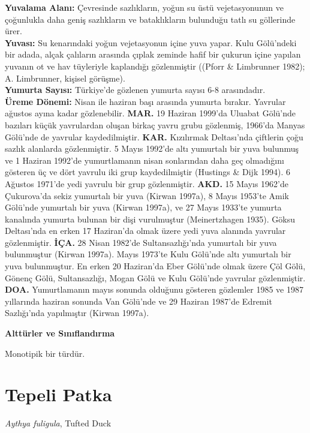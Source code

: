 \documentclass[
  letterpaper,
  DIV=11,
  numbers=noendperiod]{scrreprt}
\begin{document}
\textbf{Yuvalama Alanı:} Çevresinde sazlıkların, yoğun su üstü
vejetasyonunun ve çoğunlukla daha geniş sazlıkların ve bataklıkların
bulunduğu tatlı su göllerinde ürer.\\
\textbf{Yuvası:} Su kenarındaki yoğun vejetasyonun içine yuva yapar.
Kulu Gölü'ndeki bir adada, alçak çalıların arasında çıplak zeminde hafif
bir çukurun içine yapılan yuvanın ot ve hav tüyleriyle kaplandığı
gözlenmiştir ((Pforr \& Limbrunner 1982); A. Limbrunner, kişisel
görüşme).\\
\textbf{Yumurta Sayısı:} Türkiye'de gözlenen yumurta sayısı 6-8
arasındadır.\\
\textbf{Üreme Dönemi:} Nisan ile haziran başı arasında yumurta bırakır.
Yavrular ağustos ayına kadar gözlenebilir. \textbf{MAR.} 19 Haziran
1999'da Uluabat Gölü'nde bazıları küçük yavrulardan oluşan birkaç yavru
grubu gözlenmiş, 1966'da Manyas Gölü'nde de yavrular kaydedilmiştir.
\textbf{KAR.} Kızılırmak Deltası'nda çiftlerin çoğu sazlık alanlarda
gözlenmiştir. 5 Mayıs 1992'de altı yumurtalı bir yuva bulunmuş ve 1
Haziran 1992'de yumurtlamanın nisan sonlarından daha geç olmadığını
gösteren üç ve dört yavrulu iki grup kaydedilmiştir (Hustings \& Dijk
1994). 6 Ağustos 1971'de yedi yavrulu bir grup gözlenmiştir.
\textbf{AKD.} 15 Mayıs 1962'de Çukurova'da sekiz yumurtalı bir yuva
(Kirwan 1997a), 8 Mayıs 1953'te Amik Gölü'nde yumurtalı bir yuva (Kirwan
1997a), ve 27 Mayıs 1933'te yumurta kanalında yumurta bulunan bir dişi
vurulmuştur (Meinertzhagen 1935). Göksu Deltası'nda en erken 17
Haziran'da olmak üzere yedi yuva alanında yavrular gözlenmiştir.
\textbf{İÇA.} 28 Nisan 1982'de Sultansazlığı'nda yumurtalı bir yuva
bulunmuştur (Kirwan 1997a). Mayıs 1973'te Kulu Gölü'nde altı yumurtalı
bir yuva bulunmuştur. En erken 20 Haziran'da Eber Gölü'nde olmak üzere
Çöl Gölü, Gönenç Gölü, Sultansazlığı, Mogan Gölü ve Kulu Gölü'nde
yavrular gözlenmiştir. \textbf{DOA.} Yumurtlamanın mayıs sonunda
olduğunu gösteren gözlemler 1985 ve 1987 yıllarında haziran sonunda Van
Gölü'nde ve 29 Haziran 1987'de Edremit Sazlığı'nda yapılmıştır (Kirwan
1997a).

\textbf{Alttürler ve Sınıflandırma}

Monotipik bir türdür.

\section{Tepeli Patka}\label{tepeli-patka}

\emph{Aythya fuligula}, Tufted Duck
\end{document}
